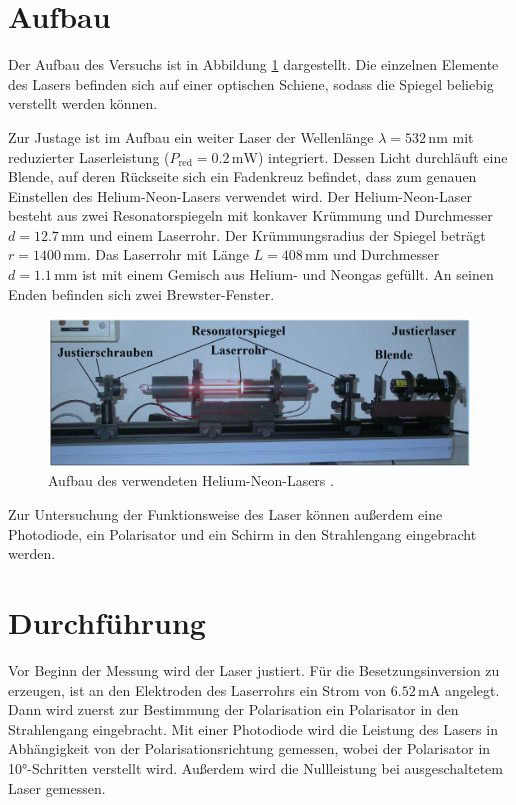\section{Aufbau}
Der Aufbau des Versuchs ist in Abbildung \ref{fig:dfig1} dargestellt. Die einzelnen Elemente des Lasers befinden sich 
auf einer optischen Schiene, sodass die Spiegel beliebig verstellt werden können. 

Zur Justage ist im Aufbau ein weiter Laser der Wellenlänge $\lambda = 532 \, \si{\nano\meter}$ mit reduzierter 
Laserleistung ($P_\text{red} = 0.2 \, \si{\milli\watt}$) integriert. Dessen Licht durchläuft eine Blende, auf deren Rückseite sich ein Fadenkreuz befindet, 
dass zum genauen Einstellen des Helium-Neon-Lasers verwendet wird.
Der Helium-Neon-Laser besteht aus zwei Resonatorspiegeln mit konkaver Krümmung und Durchmesser $d = 12.7 \, \si{\milli\meter}$ und einem Laserrohr.
Der Krümmungsradius der Spiegel beträgt $r = 1400 \, \si{\milli\meter}$. Das Laserrohr mit Länge $L = 408 \, \si{\milli\meter}$
und Durchmesser $d = 1.1 \, \si{\milli\meter}$ ist mit einem Gemisch aus Helium- und Neongas gefüllt. An seinen Enden 
befinden sich zwei Brewster-Fenster.
\FloatBarrier
    \begin{figure}[h]
    \centering
    \includegraphics[width=\textwidth]{aufbau.png}
    \caption{Aufbau des verwendeten Helium-Neon-Lasers \cite{quelle01}.}
    \label{fig:dfig1}
    \end{figure}
\FloatBarrier
\noindent
Zur Untersuchung der Funktionsweise des Laser können außerdem eine Photodiode, ein Polarisator und ein Schirm
in den Strahlengang eingebracht werden. 

\section{Durchführung}
Vor Beginn der Messung wird der Laser justiert. Für die Besetzungsinversion zu erzeugen, ist an den Elektroden des
Laserrohrs ein Strom von $6.52 \, \si{\milli\ampere}$ angelegt.
Dann wird zuerst zur Bestimmung der Polarisation ein Polarisator in den Strahlengang eingebracht. Mit einer Photodiode
wird die Leistung des Lasers in Abhängigkeit von der Polarisationsrichtung gemessen, wobei der Polarisator in
10°-Schritten verstellt wird. 
Außerdem wird die Nullleistung bei ausgeschaltetem Laser gemessen.

